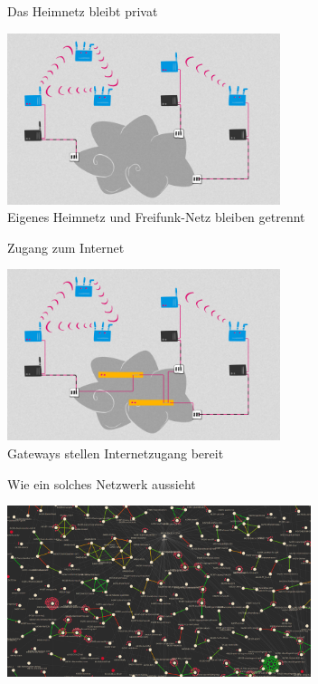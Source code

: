 \documentclass[10pt]{beamer}
\begin{document}
  \begin{frame}{Das Heimnetz bleibt privat}
    \begin{center}
      \includegraphics[height=5cm]{images/network_4}\\
      \vspace{1em}
      Eigenes Heimnetz und Freifunk-Netz bleiben getrennt
      \vspace{1em}
    \end{center}
  \end{frame}

  \begin{frame}{Zugang zum Internet}
    \begin{center}
      \includegraphics[height=5cm]{images/network_5}\\
      \vspace{1em}
      Gateways stellen Internetzugang bereit
      \vspace{1em}
    \end{center}
  \end{frame}

  \begin{frame}{Wie ein solches Netzwerk aussieht}
    \begin{center}
      \includegraphics[height=5cm]{images/mesh_medium}\\
    \end{center}
  \end{frame}
\end{document}
